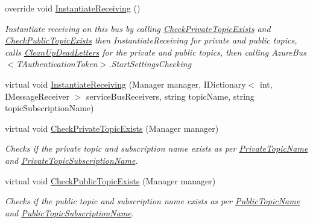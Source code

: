 \begin{DoxyCompactItemize}
override void \hyperlink{classCqrs_1_1Azure_1_1ServiceBus_1_1AzureServiceBus_ad49a2d063279ec98443e7f1d69178cfa_ad49a2d063279ec98443e7f1d69178cfa}{Instantiate\+Receiving} ()
\begin{DoxyCompactList}\small\item\em Instantiate receiving on this bus by calling \hyperlink{classCqrs_1_1Azure_1_1ServiceBus_1_1AzureServiceBus_ab0cafe4b76db0e35dce9b04cba464c50_ab0cafe4b76db0e35dce9b04cba464c50}{Check\+Private\+Topic\+Exists} and \hyperlink{classCqrs_1_1Azure_1_1ServiceBus_1_1AzureServiceBus_a4938623573b2aa81b295a247cb76c9ff_a4938623573b2aa81b295a247cb76c9ff}{Check\+Public\+Topic\+Exists} then Instantiate\+Receiving for private and public topics, calls \hyperlink{classCqrs_1_1Azure_1_1ServiceBus_1_1AzureServiceBus_a8d1d5833d49b7793933825f2a13fb8b7_a8d1d5833d49b7793933825f2a13fb8b7}{Clean\+Up\+Dead\+Letters} for the private and public topics, then calling Azure\+Bus$<$\+T\+Authentication\+Token$>$.\+Start\+Settings\+Checking \end{DoxyCompactList}\item 
virtual void \hyperlink{classCqrs_1_1Azure_1_1ServiceBus_1_1AzureServiceBus_a857b7ac22335476713c601fb1ce649c8_a857b7ac22335476713c601fb1ce649c8}{Instantiate\+Receiving} (Manager manager, I\+Dictionary$<$ int, I\+Message\+Receiver $>$ service\+Bus\+Receivers, string topic\+Name, string topic\+Subscription\+Name)
\item 
virtual void \hyperlink{classCqrs_1_1Azure_1_1ServiceBus_1_1AzureServiceBus_ab0cafe4b76db0e35dce9b04cba464c50_ab0cafe4b76db0e35dce9b04cba464c50}{Check\+Private\+Topic\+Exists} (Manager manager)
\begin{DoxyCompactList}\small\item\em Checks if the private topic and subscription name exists as per \hyperlink{classCqrs_1_1Azure_1_1ServiceBus_1_1AzureServiceBus_a7af8ebcdd25672ff2252085637904f82_a7af8ebcdd25672ff2252085637904f82}{Private\+Topic\+Name} and \hyperlink{classCqrs_1_1Azure_1_1ServiceBus_1_1AzureServiceBus_a22498d51bba26c801b3b553fb451a6ae_a22498d51bba26c801b3b553fb451a6ae}{Private\+Topic\+Subscription\+Name}. \end{DoxyCompactList}\item 
virtual void \hyperlink{classCqrs_1_1Azure_1_1ServiceBus_1_1AzureServiceBus_a4938623573b2aa81b295a247cb76c9ff_a4938623573b2aa81b295a247cb76c9ff}{Check\+Public\+Topic\+Exists} (Manager manager)
\begin{DoxyCompactList}\small\item\em Checks if the public topic and subscription name exists as per \hyperlink{classCqrs_1_1Azure_1_1ServiceBus_1_1AzureServiceBus_ac6f4fbafebcde04a8493462b688e0abe_ac6f4fbafebcde04a8493462b688e0abe}{Public\+Topic\+Name} and \hyperlink{classCqrs_1_1Azure_1_1ServiceBus_1_1AzureServiceBus_adab1b2f0dc9f199d5f0aa60d57ba71c8_adab1b2f0dc9f199d5f0aa60d57ba71c8}{Public\+Topic\+Subscription\+Name}. \end{DoxyCompactList}\item 

\end{DoxyCompactItemize}
